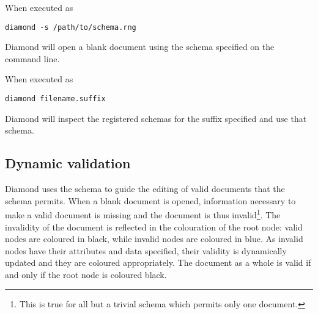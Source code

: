 \documentclass[a4paper, 11pt]{book}
\begin{document}
When executed as
\begin{verbatim}
diamond -s /path/to/schema.rng
\end{verbatim}
Diamond will open a blank document using the schema specified on the command line.

When executed as
\begin{verbatim}
diamond filename.suffix
\end{verbatim}
Diamond will inspect the registered schemas for the suffix specified
and use that schema.

\subsection{Dynamic validation}
Diamond uses the schema to guide the editing of valid documents that the schema
permits. When a blank document is opened, information necessary to make a valid
document is missing and the document is thus invalid\footnote{This is true for all
but a trivial schema which permits only one document.}. The invalidity of the document
is reflected in the colouration of the root node: valid nodes are coloured in black,
while invalid nodes are coloured in blue. As invalid nodes have their attributes
and data specified, their validity is dynamically updated and they are coloured appropriately.
The document as a whole is valid if and only if the root node is coloured black.
\end{document}
